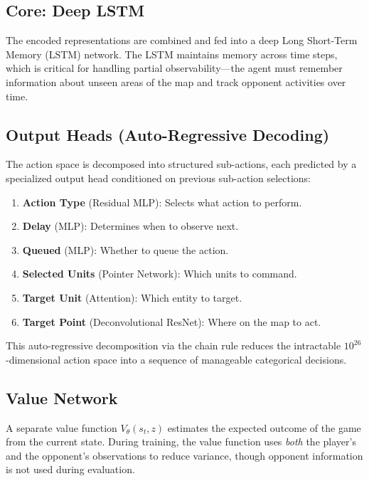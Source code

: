 \documentclass[11pt,a4paper]{article}
\begin{document}
\subsection{Core: Deep LSTM}

The encoded representations are combined and fed into a deep Long Short-Term Memory (LSTM) network. The LSTM maintains memory across time steps, which is critical for handling partial observability---the agent must remember information about unseen areas of the map and track opponent activities over time.

\subsection{Output Heads (Auto-Regressive Decoding)}

The action space is decomposed into structured sub-actions, each predicted by a specialized output head conditioned on previous sub-action selections:

\begin{enumerate}[nosep]
    \item \textbf{Action Type} (Residual MLP): Selects what action to perform.
    \item \textbf{Delay} (MLP): Determines when to observe next.
    \item \textbf{Queued} (MLP): Whether to queue the action.
    \item \textbf{Selected Units} (Pointer Network): Which units to command.
    \item \textbf{Target Unit} (Attention): Which entity to target.
    \item \textbf{Target Point} (Deconvolutional ResNet): Where on the map to act.
\end{enumerate}

This auto-regressive decomposition via the chain rule reduces the intractable $10^{26}$-dimensional action space into a sequence of manageable categorical decisions.

\subsection{Value Network}

A separate value function $V_\theta(s_t, z)$ estimates the expected outcome of the game from the current state. During training, the value function uses \emph{both} the player's and the opponent's observations to reduce variance, though opponent information is not used during evaluation.
\end{document}
